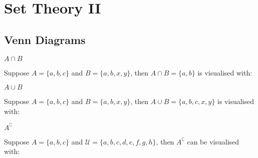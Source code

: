 \chapter{Set Theory II}

\section{Venn Diagrams}

$A \cap B$\\
\begin{venndiagram2sets}[shade=skyblue,showframe=false]
	\fillACapB
\end{venndiagram2sets}

\myexample
{
	Suppose $A=\{a,b,c\}$ and $B=\{a,b,x,y\}$, then $A \cap B=\{a,b\}$ is visualised with:\\
	\begin{venndiagram2sets}[shade=skyblue,showframe=false,labelOnlyA={c},labelOnlyB={x,y},labelAB={a,b}]
		\fillACapB
	\end{venndiagram2sets}
}

$A \cup B$\\
\begin{venndiagram2sets}[shade=skyblue,showframe=false]
	\fillA \fillB
\end{venndiagram2sets}

\myexample
{
	Suppose $A=\{a,b,c\}$ and $B=\{a,b,x,y\}$, then $A \cup B=\{a,b,c,x,y\}$  is visualised with:\\
	\begin{venndiagram2sets}[shade=skyblue,showframe=false,labelOnlyA={c},labelOnlyB={x,y},labelAB={a,b}]
		\fillA \fillB
	\end{venndiagram2sets}
}

$A^\complement$\\
\begin{venndiagram2sets}[shade=skyblue,overlap=2.4cm,hgap=2.2cm,vgap=0.5cm,labelNotAB={\;\quad\qquad $\mathcal{U}$},labelB={}]
	\fillNotA
\end{venndiagram2sets}

\myexample
{
	Suppose $A=\{a,b,c\}$ and $\mathcal{U}=\{a,b,c,d,e,f,g,h\}$, then $A^\complement$ can be visualised with:\\
	\begin{venndiagram2sets}[shade=skyblue,overlap=2.4cm,hgap=2.2cm,vgap=0.5cm,labelNotAB={\;\quad\qquad $\mathcal{U}$ \: $d,e,f,g,h$},labelOnlyA={$a,b,c$},labelB={}]
		\fillNotA
	\end{venndiagram2sets}
}

